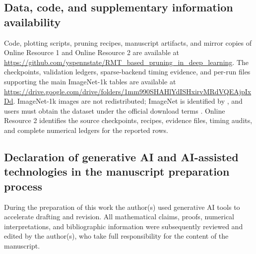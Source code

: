 \documentclass[11pt]{article}
\theoremstyle{plain}
\theoremstyle{definition}
\theoremstyle{remark}
\newcommand{\1}{\mathbf{1}}
\newcommand{\repoURL}{\url{https://github.com/yspennstate/RMT_based_pruning_in_deep_learning}}
\begin{document}
\subsection*{Data, code, and supplementary information availability}
Code, plotting scripts, pruning recipes, manuscript artifacts, and mirror copies of Online Resource 1 and Online Resource 2 are available at \repoURL. The checkpoints, validation ledgers, sparse-backend timing evidence, and per-run files supporting the main ImageNet-1k tables are available at
\url{https://drive.google.com/drive/folders/1mm990SHAHlYdISHxirvMRdVQEAjpIxDd}. ImageNet-1k images are not redistributed; ImageNet is identified by \cite{5206848}, and users must obtain the dataset under the official download terms \cite{imagenet_download_terms}. Online Resource 2 identifies the source checkpoints, recipes, evidence files, timing audits, and complete numerical ledgers for the reported rows.

\subsection*{Declaration of generative AI and AI-assisted technologies in the manuscript preparation process}
During the preparation of this work the author(s) used generative AI tools to accelerate drafting and revision. All mathematical claims, proofs, numerical interpretations, and bibliographic information were subsequently reviewed and edited by the author(s), who take full responsibility for the content of the manuscript.




\end{document}
